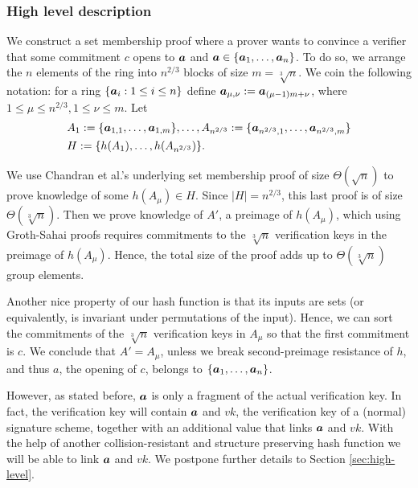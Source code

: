 \subsubsection{High level description}
We construct a set membership proof where a prover wants to convince a verifier that some commitment $c$ opens to ${\boldsymbol{a}}$ and ${\boldsymbol{a}}\in\{{\boldsymbol{a}}_1,\ldots,{\boldsymbol{a}}_n\}$. To do so, we arrange the $n$ elements of the ring into $n^{2/3}$ blocks of size $m=\sqrt[3]{n}$. We coin the following notation: for a ring $\{{\boldsymbol{a}}_i:1\leq i \leq n\}$ define ${\boldsymbol{a}}_{\mu,\nu}:={\boldsymbol{a}}_{(\mu-1)m+\nu}$, where  $1\leq\mu\leq n^{2/3},1\leq \nu\leq m$.  Let
\begin{align*}
& A_1 := \{{\boldsymbol{a}}_{1,1},\ldots,{\boldsymbol{a}}_{1,m}\},\ldots, A_{n^{2/3}} := \{{\boldsymbol{a}}_{n^{2/3},1},\ldots,{\boldsymbol{a}}_{n^{2/3},m}\}\\
&H:=\{h(A_1),\ldots,\allowbreak h(A_{n^{2/3}})\}.
\end{align*}

We use Chandran et al.'s underlying set membership proof of size $\Theta(\sqrt{n})$ to prove knowledge of some $h(A_\mu)\in H$. Since $|H|=n^{2/3}$, this last proof is of size $\Theta(\sqrt[3]{n})$. Then we prove knowledge of $A'$, a preimage of $h(A_\mu)$, which using Groth-Sahai proofs requires commitments to the $\sqrt[3]{n}$ verification keys in the preimage of $h(A_\mu)$. Hence, the total size of the proof adds up to $\Theta(\sqrt[3]{n})$ group elements.

Another nice property of our hash function is that its inputs are sets (or equivalently, is invariant under permutations of the input). Hence, we can sort the commitments of the $\sqrt[3]{n}$ verification keys in $A_\mu$ so that the first commitment is $c$. We conclude that $A'=A_\mu$, unless we break second-preimage resistance of $h$, and thus $a$, the opening of $c$, belongs to $\{{\boldsymbol{a}}_1,\ldots,{\boldsymbol{a}}_n\}$.

However, as stated before, ${\boldsymbol{a}}$ is only a fragment of the actual verification key. In fact, the verification key will contain ${\boldsymbol{a}}$ and $vk$, the verification key of a (normal) signature scheme, together with an additional value that links ${\boldsymbol{a}}$ and $vk$. With the help of another collision-resistant and structure preserving hash function we will be able to link ${\boldsymbol{a}}$ and $vk$. We postpone further details to Section \ref{sec:high-level}.